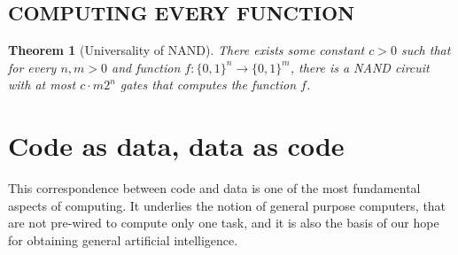 \documentclass[aps,pra,onecolumn,notitlepage,superscriptaddress]{revtex4-1}
\newtheorem{theo}{Theorem}
\begin{document}
    \subsection{COMPUTING EVERY FUNCTION}
    \begin{theo} [Universality of NAND]
        There exists some constant $c > 0$ such that for every $n, m > 0$ and function $f : \{0, 1\}^n \to \{0, 1\}^m$, there is a NAND circuit with at most $c \cdot m 2^n$ gates that computes the function $f$.
    \end{theo}

    \section{Code as data, data as code}
    This correspondence between code and data is one of the most fundamental aspects of computing. It underlies the notion of general purpose computers, that are not pre-wired to compute only one task, and it is also the basis of our hope for obtaining general artificial intelligence.

    
\end{document}

